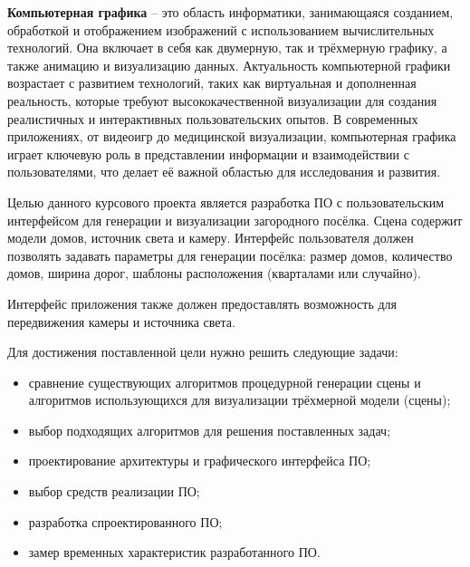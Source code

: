
\textbf{Компьютерная графика} -- это область информатики, занимающаяся созданием, обработкой и отображением изображений с использованием вычислительных технологий. Она включает в себя как двумерную, так и трёхмерную графику, а также анимацию и визуализацию данных. Актуальность компьютерной графики возрастает с развитием технологий, таких как виртуальная и дополненная реальность, которые требуют высококачественной визуализации для создания реалистичных и интерактивных пользовательских опытов. В современных приложениях, от видеоигр до медицинской визуализации, компьютерная графика играет ключевую роль в представлении информации и взаимодействии с пользователями, что делает её важной областью для исследования и развития.

Целью данного курсового проекта является разработка ПО с пользовательским интерфейсом для генерации и визуализации загородного посёлка. Сцена содержит модели домов, источник света и камеру. Интерфейс пользователя должен позволять задавать параметры для генерации посёлка: размер домов, количество домов, ширина дорог, шаблоны расположения (кварталами или случайно). 

Интерфейс приложения также должен предоставлять возможность для передвижения камеры и источника света.

Для достижения поставленной цели нужно решить следующие задачи:
\begin{itemize}
  \item сравнение существующих алгоритмов процедурной генерации сцены и алгоритмов использующихся для визуализации трёхмерной модели (сцены);
  \item выбор подходящих алгоритмов для решения поставленных задач;
  \item проектирование архитектуры и графического интерфейса ПО;
  \item выбор средств реализации ПО;
  \item разработка спроектированного ПО;
  \item замер временных характеристик разработанного ПО.
\end{itemize}
\clearpage